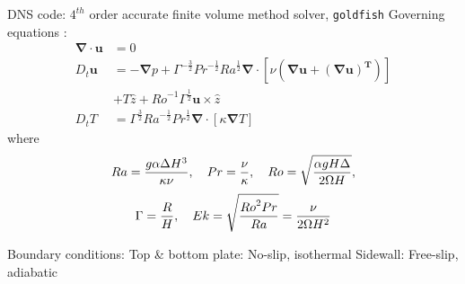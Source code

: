 \begin{outline}
	\1 DNS code: $4^{th}$ order accurate finite volume method solver, \texttt{goldfish} \cite{Shishkina2005}
	\1 Governing equations \cite{Panton2013}:
$$
\begin{aligned}
	\mathbf{\nabla} \cdot \mathbf{u} &= 0 \\
	{D}_t \mathbf{u} &=
	-\mathbf{\nabla}{p} + \Gamma^{-\frac{3}{2}}
	{Pr}^{-\frac{1}{2}} {Ra}^{\frac{1}{2}} {\mathbf{\nabla}}
	\cdot \left[ \nu \left( {\mathbf{\nabla}}
	{\mathbf{u}} + \left( {\mathbf{\nabla}}
	{\mathbf{u}} \right)^\mathbf{T} \right) \right] \\ 
        & + {T} \hat{z} + {Ro}^{-1} \Gamma^{\frac{1}{2}}
	{\mathbf{u}} \times \hat{z} \\
	{{D}_t} {{T}} &= \Gamma^{\frac{3}{2}} {Ra}^{-\frac{1}{2}}
	{Pr}^{\frac{1}{2}} {\mathbf{\nabla}} \cdot \left[ \kappa
	{\mathbf{\nabla}} {{T}} \right]
\end{aligned}
$$
\1 where
$$
	{Ra} = \frac{g \alpha \Delta {H}^3}{\kappa \nu} \space, \quad
	{Pr} = \frac{\nu}{\kappa} \space, \quad
	{Ro} = \sqrt{\frac{\alpha g {H} \Delta}{2 \Omega {H}}} \space,
$$
$$
        \Gamma = \frac{{R}}{{H}} \space, \quad
        {Ek} = \sqrt{\frac{{Ro}^2 {Pr}}{{Ra}}} = \frac{\nu}{2 \Omega {H}^2}
$$
\end{outline}

\begin{outline}
    \1 Boundary conditions: 
    \2 Top \& bottom plate: No-slip, isothermal
    \2 Sidewall: Free-slip, adiabatic
\end{outline}
